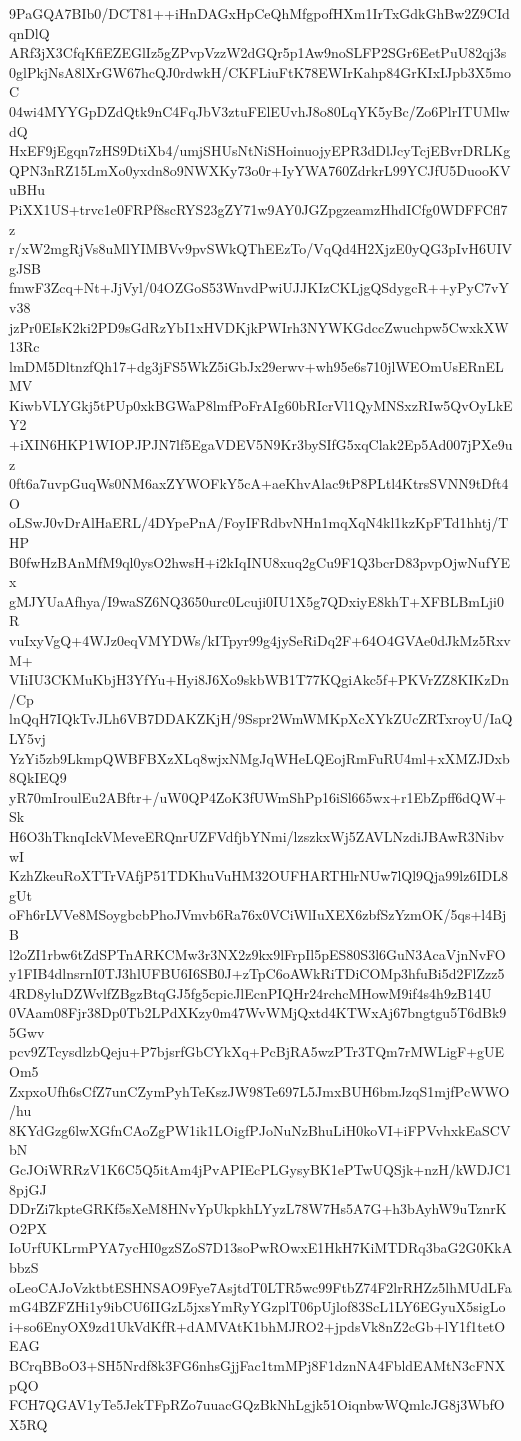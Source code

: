 9PaGQA7BIb0/DCT81++iHnDAGxHpCeQhMfgpofHXm1IrTxGdkGhBw2Z9CIdqnDlQ
ARf3jX3CfqKfiEZEGlIz5gZPvpVzzW2dGQr5p1Aw9noSLFP2SGr6EetPuU82qj3s
0glPkjNsA8lXrGW67hcQJ0rdwkH/CKFLiuFtK78EWIrKahp84GrKIxIJpb3X5moC
04wi4MYYGpDZdQtk9nC4FqJbV3ztuFElEUvhJ8o80LqYK5yBc/Zo6PlrITUMlwdQ
HxEF9jEgqn7zHS9DtiXb4/umjSHUsNtNiSHoinuojyEPR3dDlJcyTcjEBvrDRLKg
QPN3nRZ15LmXo0yxdn8o9NWXKy73o0r+IyYWA760ZdrkrL99YCJfU5DuooKVuBHu
PiXX1US+trvc1e0FRPf8scRYS23gZY71w9AY0JGZpgzeamzHhdICfg0WDFFCfl7z
r/xW2mgRjVs8uMlYIMBVv9pvSWkQThEEzTo/VqQd4H2XjzE0yQG3pIvH6UIVgJSB
fmwF3Zcq+Nt+JjVyl/04OZGoS53WnvdPwiUJJKIzCKLjgQSdygcR++yPyC7vYv38
jzPr0EIsK2ki2PD9sGdRzYbI1xHVDKjkPWIrh3NYWKGdccZwuchpw5CwxkXW13Rc
lmDM5DltnzfQh17+dg3jFS5WkZ5iGbJx29erwv+wh95e6s710jlWEOmUsERnELMV
KiwbVLYGkj5tPUp0xkBGWaP8lmfPoFrAIg60bRIcrVl1QyMNSxzRIw5QvOyLkEY2
+iXIN6HKP1WIOPJPJN7lf5EgaVDEV5N9Kr3bySIfG5xqClak2Ep5Ad007jPXe9uz
0ft6a7uvpGuqWs0NM6axZYWOFkY5cA+aeKhvAlac9tP8PLtl4KtrsSVNN9tDft4O
oLSwJ0vDrAlHaERL/4DYpePnA/FoyIFRdbvNHn1mqXqN4kl1kzKpFTd1hhtj/THP
B0fwHzBAnMfM9ql0ysO2hwsH+i2kIqINU8xuq2gCu9F1Q3bcrD83pvpOjwNufYEx
gMJYUaAfhya/I9waSZ6NQ3650urc0Lcuji0IU1X5g7QDxiyE8khT+XFBLBmLji0R
vuIxyVgQ+4WJz0eqVMYDWs/kITpyr99g4jySeRiDq2F+64O4GVAe0dJkMz5RxvM+
VIiIU3CKMuKbjH3YfYu+Hyi8J6Xo9skbWB1T77KQgiAkc5f+PKVrZZ8KIKzDn/Cp
lnQqH7IQkTvJLh6VB7DDAKZKjH/9Sspr2WmWMKpXcXYkZUcZRTxroyU/IaQLY5vj
YzYi5zb9LkmpQWBFBXzXLq8wjxNMgJqWHeLQEojRmFuRU4ml+xXMZJDxb8QkIEQ9
yR70mIroulEu2ABftr+/uW0QP4ZoK3fUWmShPp16iSl665wx+r1EbZpff6dQW+Sk
H6O3hTknqIckVMeveERQnrUZFVdfjbYNmi/lzszkxWj5ZAVLNzdiJBAwR3NibvwI
KzhZkeuRoXTTrVAfjP51TDKhuVuHM32OUFHARTHlrNUw7lQl9Qja99lz6IDL8gUt
oFh6rLVVe8MSoygbcbPhoJVmvb6Ra76x0VCiWlIuXEX6zbfSzYzmOK/5qs+l4BjB
l2oZI1rbw6tZdSPTnARKCMw3r3NX2z9kx9lFrpIl5pES80S3l6GuN3AcaVjnNvFO
y1FIB4dlnsrnI0TJ3hlUFBU6I6SB0J+zTpC6oAWkRiTDiCOMp3hfuBi5d2FlZzz5
4RD8yluDZWvlfZBgzBtqGJ5fg5cpicJlEcnPIQHr24rchcMHowM9if4s4h9zB14U
0VAam08Fjr38Dp0Tb2LPdXKzy0m47WvWMjQxtd4KTWxAj67bngtgu5T6dBk95Gwv
pcv9ZTcysdlzbQeju+P7bjsrfGbCYkXq+PcBjRA5wzPTr3TQm7rMWLigF+gUEOm5
ZxpxoUfh6sCfZ7unCZymPyhTeKszJW98Te697L5JmxBUH6bmJzqS1mjfPcWWO/hu
8KYdGzg6lwXGfnCAoZgPW1ik1LOigfPJoNuNzBhuLiH0koVI+iFPVvhxkEaSCVbN
GcJOiWRRzV1K6C5Q5itAm4jPvAPIEcPLGysyBK1ePTwUQSjk+nzH/kWDJC18pjGJ
DDrZi7kpteGRKf5sXeM8HNvYpUkpkhLYyzL78W7Hs5A7G+h3bAyhW9uTznrKO2PX
IoUrfUKLrmPYA7ycHI0gzSZoS7D13soPwROwxE1HkH7KiMTDRq3baG2G0KkAbbzS
oLeoCAJoVzktbtESHNSAO9Fye7AsjtdT0LTR5wc99FtbZ74F2lrRHZz5lhMUdLFa
mG4BZFZHi1y9ibCU6IIGzL5jxsYmRyYGzplT06pUjlof83ScL1LY6EGyuX5sigLo
i+so6EnyOX9zd1UkVdKfR+dAMVAtK1bhMJRO2+jpdsVk8nZ2cGb+lY1f1tetOEAG
BCrqBBoO3+SH5Nrdf8k3FG6nhsGjjFac1tmMPj8F1dznNA4FbldEAMtN3cFNXpQO
FCH7QGAV1yTe5JekTFpRZo7uuacGQzBkNhLgjk51OiqnbwWQmlcJG8j3WbfOX5RQ
